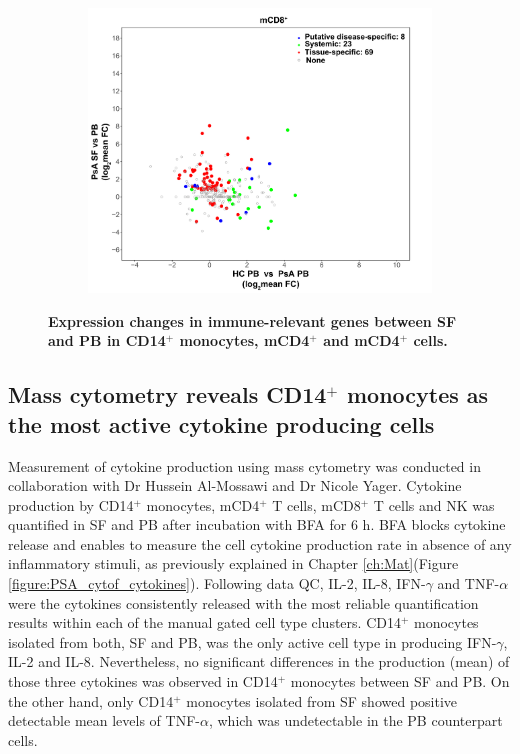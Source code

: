 \begin{figure}[htbp]
\begin{subfigure}{0.5\textwidth}
\caption{\textbf{}}
\end{subfigure} %
\begin{subfigure}{0.5\textwidth}
\centering
\includegraphics[width=\textwidth]{./Results3/pdfs/PSA_array_correlation_CD8_FC_HVPsA_vs_SFPBPsA}
\caption{\textbf{}}
\end{subfigure}
\caption[Expression changes in immune-relevant genes between SF and PB in CD14$^+$ monocytes, mCD4$^+$ and mCD4$^+$ cells.]{\textbf{Expression changes in immune-relevant genes between SF and PB in CD14$^+$ monocytes, mCD4$^+$ and mCD4$^+$ cells.}}
\label{fig:PSA_PCR_array_HC_FC_correlation}
\end{figure} 



\subsection{Mass cytometry reveals CD14$^+$ monocytes as the most active cytokine producing cells}

Measurement of cytokine production using mass cytometry was conducted in collaboration with Dr Hussein Al-Mossawi and Dr Nicole Yager. Cytokine production by CD14$^+$ monocytes, mCD4$^+$ T cells, mCD8$^+$ T cells and NK was quantified in SF and PB after incubation with BFA for 6 h. BFA blocks cytokine release and enables to measure the cell cytokine production rate in absence of any inflammatory stimuli, as previously explained in Chapter \ref{ch:Mat}(Figure \ref{figure:PSA_cytof_cytokines}). Following data QC, IL-2, IL-8, IFN-$\gamma$ and TNF-$\alpha$ were the cytokines consistently released with the most reliable quantification results within each of the manual gated cell type clusters. CD14$^+$ monocytes isolated from both, SF and PB, was the only active cell type in producing IFN-$\gamma$, IL-2 and IL-8. Nevertheless, no significant differences in the production (mean) of those three cytokines was observed in CD14$^+$ monocytes between SF and PB. On the other hand, only CD14$^+$ monocytes isolated from SF showed positive detectable mean levels of TNF-$\alpha$, which was undetectable in the PB counterpart cells. 

